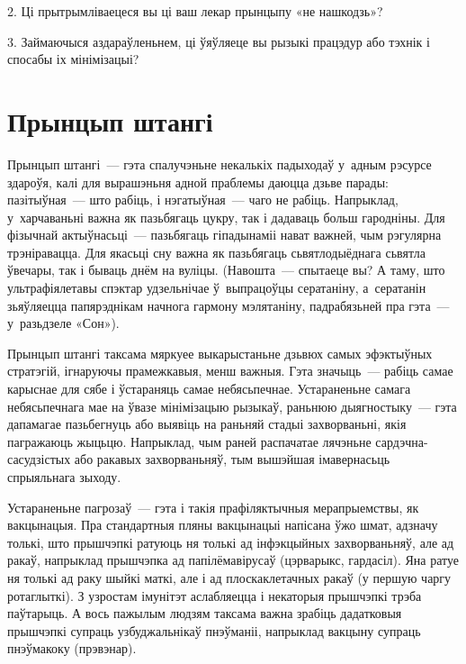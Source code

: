 2. Ці прытрымліваецеся вы ці ваш лекар прынцыпу «не нашкодзь»?

3. Займаючыся аздараўленьнем, ці ўяўляеце вы рызыкі працэдур або тэхнік і спосабы іх мінімізацыі?


\section{Прынцып штангі}

Прынцып штангі~--- гэта спалучэньне некалькіх падыходаў у~адным рэсурсе здароўя, калі для вырашэньня адной праблемы даюцца дзьве парады: пазітыўная~--- што рабіць, і нэгатыўная~--- чаго не рабіць. Напрыклад, у~харчаваньні важна як пазьбягаць цукру, так і дадаваць больш гародніны. Для фізычнай актыўнасьці~--- пазьбягаць гіпадынаміі нават важней, чым рэгулярна трэніравацца. Для якасьці сну важна як пазьбягаць сьвятлодыёднага сьвятла ўвечары, так і бываць днём на вуліцы. (Навошта~--- спытаеце вы? А таму, што ультрафіялетавы спэктар удзельнічае ў~выпрацоўцы сератаніну, а~сератанін зьяўляецца папярэднікам начнога гармону мэлятаніну, падрабязьней пра гэта~--- у~разьдзеле «Сон»).

Прынцып штангі таксама мяркуее выкарыстаньне дзьвюх самых эфэктыўных стратэгій, ігнаруючы прамежкавыя, менш важныя. Гэта значыць~--- рабіць самае карыснае для сябе і ўстараняць самае небясьпечнае. Устараненьне самага небясьпечнага мае на ўвазе мінімізацыю рызыкаў, раньнюю дыягностыку~--- гэта дапамагае пазьбегнуць або выявіць на раньняй стадыі захворваньні, якія пагражаюць жыцьцю. Напрыклад, чым раней распачатае лячэньне сардэчна-сасудзістых або ракавых захворваньняў, тым вышэйшая імавернасьць спрыяльнага зыходу.

Устараненьне пагрозаў~--- гэта і такія прафіляктычныя мерапрыемствы, як вакцынацыя. Пра стандартныя пляны вакцынацыі напісана ўжо шмат, адзначу толькі, што прышчэпкі ратуюць ня толькі ад інфэкцыйных захворваньняў, але ад ракаў, напрыклад прышчэпка ад папілёмавірусаў (цэрварыкс, гардасіл). Яна ратуе ня толькі ад раку шыйкі маткі, але і ад плоскаклетачных ракаў (у першую чаргу ротаглыткі). З узростам імунітэт аслабляецца і некаторыя прышчэпкі трэба паўтарыць. А вось пажылым людзям таксама важна зрабіць дадатковыя прышчэпкі супраць узбуджальнікаў пнэўманіі, напрыклад вакцыну супраць пнэўмакоку (прэвэнар).

